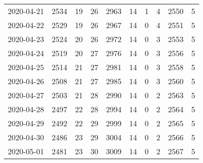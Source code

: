 \begin{longtable}{cccccccccc}
2020-04-21&2534&19&26&2963&14&1&4&2550&5\\
2020-04-22&2529&19&26&2967&14&0&4&2551&5\\
2020-04-23&2524&20&26&2972&14&0&3&2553&5\\
2020-04-24&2519&20&27&2976&14&0&3&2556&5\\
2020-04-25&2514&21&27&2981&14&0&3&2558&5\\
2020-04-26&2508&21&27&2985&14&0&3&2560&5\\
2020-04-27&2503&21&28&2990&14&0&2&2563&5\\
2020-04-28&2497&22&28&2994&14&0&2&2564&5\\
2020-04-29&2492&22&29&2999&14&0&2&2565&5\\
2020-04-30&2486&23&29&3004&14&0&2&2566&5\\
2020-05-01&2481&23&30&3009&14&0&2&2567&5\\
\hline
\end{longtable}